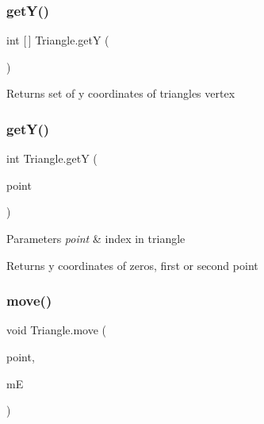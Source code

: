 \subsubsection{\texorpdfstring{get\+Y()}{getY()}\hspace{0.1cm}{\footnotesize\ttfamily [1/2]}}
{\footnotesize\ttfamily int \mbox{[}$\,$\mbox{]} Triangle.\+getY (\begin{DoxyParamCaption}{ }\end{DoxyParamCaption})\hspace{0.3cm}{\ttfamily [inline]}}

\begin{DoxyReturn}{Returns}
set of y coordinates of triangle\textquotesingle{}s vertex 
\end{DoxyReturn}
\mbox{\label{classTriangle_ae4400d63c47585241747669c521217df}} 
\subsubsection{\texorpdfstring{get\+Y()}{getY()}\hspace{0.1cm}{\footnotesize\ttfamily [2/2]}}
{\footnotesize\ttfamily int Triangle.\+getY (\begin{DoxyParamCaption}\item[{int}]{point }\end{DoxyParamCaption})\hspace{0.3cm}{\ttfamily [inline]}}


\begin{DoxyParams}{Parameters}
{\em point} & index in triangle \\
\hline
\end{DoxyParams}
\begin{DoxyReturn}{Returns}
y coordinates of zero\textquotesingle{}s, first or second point 
\end{DoxyReturn}
\mbox{\label{classTriangle_aff9f2ebdc361427e699bdc32cdc67589}} 
\subsubsection{\texorpdfstring{move()}{move()}}
{\footnotesize\ttfamily void Triangle.\+move (\begin{DoxyParamCaption}\item[{int \mbox{[}$\,$\mbox{]}}]{point,  }\item[{Mouse\+Event}]{mE }\end{DoxyParamCaption})\hspace{0.3cm}{\ttfamily [inline]}}

